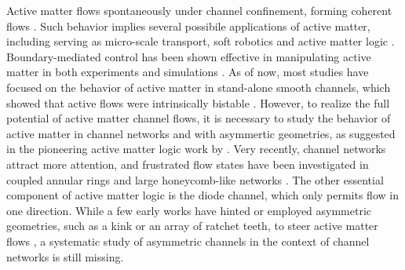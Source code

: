 \documentclass[%
10pt,
superscriptaddress,
twocolumn,
 amsmath,amssymb,
 aps,prx,
]{revtex4-2}
\begin{document}
Active matter flows spontaneously under channel confinement, forming coherent flows  \cite{Wioland2016,Wu2017,Morin2018,Hardouin2019,Hardouin2020}. 
Such behavior implies several possibile applications of active matter, including serving as micro-scale transport, soft robotics and active matter logic \cite{Thampi2022,Woodhouse2017}.
Boundary-mediated control has been shown effective in manipulating active matter in both experiments \cite{Lushi2014,Wioland2016,Wioland2016,Wu2017,Morin2018,Liu2019,Ross2019,Hardouin2019} and simulations \cite{Voituriez2005,Marenduzzo2007,Shendruk2017,Vaidya2024}.
As of now, most studies have focused on the behavior of active matter in stand-alone smooth channels, which showed that active flows were intrinsically bistable \cite{Wu2017,Morin2018}.
However, to realize the full potential of active matter channel flows, it is necessary to study the behavior of active matter in channel networks and with asymmertic geometries, as suggested in the pioneering active matter logic work by \citet{Woodhouse2017}.
Very recently, channel networks attract more attention, and frustrated flow states have been investigated in coupled annular rings \cite{Hardouin2020} and large honeycomb-like networks \cite{Jorge2024}.
The other essential component of active matter logic is the diode channel, which only permits flow in one direction.
While a few early works have hinted or employed asymmetric geometries, such as a kink or an array of ratchet teeth, to steer active matter flows \cite{ElizabethHulme2008,DiLeonardo2010,Wu2017,Hardouin2020,Ray2023,Vaidya2024}, a systematic study of asymmetric channels in the context of channel networks is still missing. 

\end{document}
